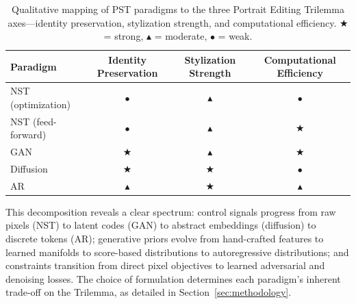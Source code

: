 \documentclass[journal]{IEEEtran}
\begin{document}
\begin{table}[t]
\centering
\caption{Qualitative mapping of PST paradigms to the three Portrait Editing Trilemma axes---identity preservation, stylization strength, and computational efficiency. $\bigstar$ = strong, $\blacktriangle$ = moderate, $\bullet$ = weak.}
\label{tab:trilemma_paradigms}
\small
\begin{tabular}{lccc}
\toprule
\textbf{Paradigm} & \textbf{Identity Preservation} & \textbf{Stylization Strength} & \textbf{Computational Efficiency} \\
\midrule
NST (optimization)  & $\bullet$ & $\blacktriangle$ & $\bullet$ \\
NST (feed-forward)  & $\bullet$ & $\blacktriangle$ & $\bigstar$ \\
GAN                 & $\bigstar$ & $\blacktriangle$ & $\bigstar$ \\
Diffusion           & $\bigstar$ & $\bigstar$ & $\bullet$ \\
AR                  & $\blacktriangle$ & $\bigstar$ & $\blacktriangle$ \\
\bottomrule
\end{tabular}
\end{table}

This decomposition reveals a clear spectrum: control signals progress from raw pixels (NST) to latent codes (GAN) to abstract embeddings (diffusion) to discrete tokens (AR); generative priors evolve from hand-crafted features to learned manifolds to score-based distributions to autoregressive distributions; and constraints transition from direct pixel objectives to learned adversarial and denoising losses. The choice of formulation determines each paradigm's inherent trade-off on the Trilemma, as detailed in Section~\ref{sec:methodology}.
\end{document}
